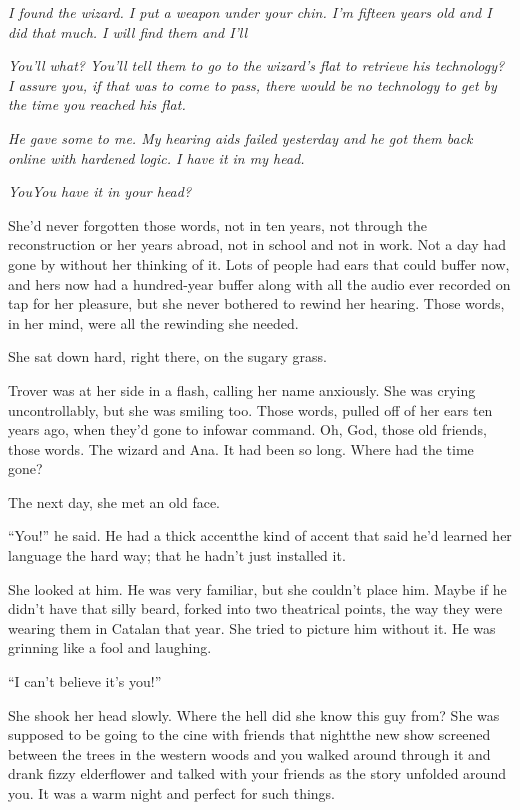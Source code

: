 \emph{I found the wizard. I put a weapon under your chin. I’m fifteen years old and I did that much. I will find them and I’ll\dash{}}

\emph{You’ll what? You’ll tell them to go to the wizard’s flat to retrieve his technology? I assure you, if that was to come to pass, there would be no technology to get by the time you reached his flat.}

\emph{He gave some to me. My hearing aids failed yesterday and he got them back online with hardened logic. I have it in my head.}

\emph{You\dash{}You have it in your head?}

She’d never forgotten those words, not in ten years, not through
the reconstruction or her years abroad, not in school and not in
work. Not a day had gone by without her thinking of it. Lots of
people had ears that could buffer now, and hers now had a
hundred-year buffer along with all the audio ever recorded on tap
for her pleasure, but she never bothered to rewind her hearing.
Those words, in her mind, were all the rewinding she needed.

She sat down hard, right there, on the sugary grass.

Trover was at her side in a flash, calling her name anxiously. She
was crying uncontrollably, but she was smiling too. Those words,
pulled off of her ears ten years ago, when they’d gone to infowar
command. Oh, God, those old friends, those words. The wizard and
Ana. It had been so long. Where had the time gone?

\tb

The next day, she met an old face.

“You!” he said. He had a thick accent\dash{}the kind of accent that said
he’d learned her language the hard way; that he hadn’t just
installed it.

She looked at him. He was very familiar, but she couldn’t place
him. Maybe if he didn’t have that silly beard, forked into two
theatrical points, the way they were wearing them in Catalan that
year. She tried to picture him without it. He was grinning like a
fool and laughing.

“I can’t believe it’s you!”

She shook her head slowly. Where the hell did she know this guy
from? She was supposed to be going to the cine with friends that
night\dash{}the new show screened between the trees in the western woods
and you walked around through it and drank fizzy elderflower and
talked with your friends as the story unfolded around you. It was a
warm night and perfect for such things.


